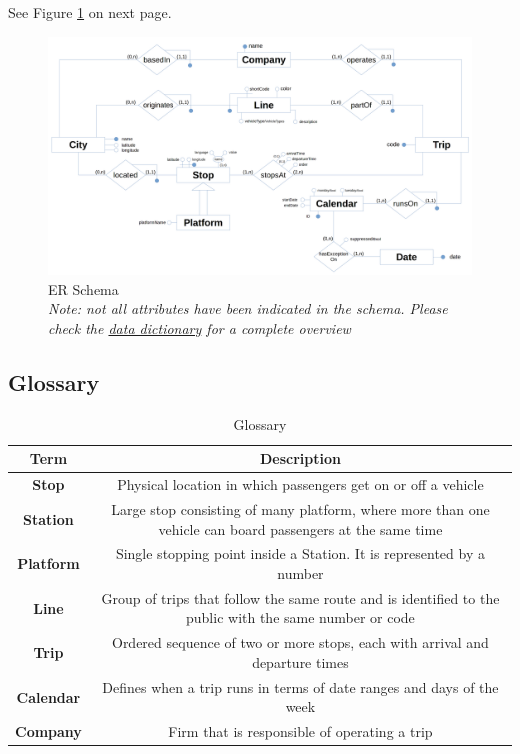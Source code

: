 	See Figure \ref{img:diagram} on next page.	

	\begin{landscape}
		\begin{figure}[htb]
			\thispagestyle{plain}
			\centering
			\includegraphics[height=\textheight]{imgs/diagram}
			\caption{ER Schema \\ {\footnotesize \textit{Note: not all attributes have been indicated in the schema. Please check the \hyperref[sec:dictionary]{data dictionary} for a complete overview}}}\label{img:diagram}
		\end{figure}
	\end{landscape}
	



\subsection{Glossary}

	\begin{table}[htb]
		\centering
		\begin{tabularx}{\columnwidth}{|c|C|}
			\hline
			\textbf{Term} & \textbf{Description} \\
			\hline
			\textbf{Stop} & Physical location in which passengers get on or off a vehicle  \\ \hline
			\textbf{Station} & Large stop consisting of many platform, where more than one vehicle can board passengers at the same time  \\ \hline
			\textbf{Platform} & Single stopping point inside a Station. It is represented by a number \\ \hline
			\textbf{Line} & Group of trips that follow the same route and is identified to the public with the same number or code  \\ \hline
			\textbf{Trip} & Ordered sequence of two or more stops, each with arrival and departure times \\ \hline
			\textbf{Calendar} & Defines when a trip runs in terms of date ranges and days of the week \\ \hline
			\textbf{Company} & Firm that is responsible of operating a trip \\
			\hline
		\end{tabularx}
		\caption{Glossary}\label{tbl:glossary}
	\end{table}

